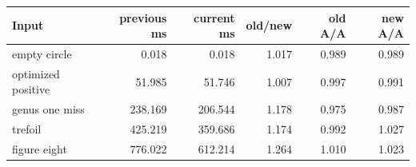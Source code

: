 \begin{center}
\small
\begin{tabular}{lrrrrr}
\toprule
Input & previous ms & current ms & old/new & old A/A & new A/A\\
\midrule
empty circle & 0.018 & 0.018 & 1.017 & 0.989 & 0.989\\
optimized positive & 51.985 & 51.746 & 1.007 & 0.997 & 0.991\\
genus one miss & 238.169 & 206.544 & 1.178 & 0.975 & 0.987\\
trefoil & 425.219 & 359.686 & 1.174 & 0.992 & 1.027\\
figure eight & 776.022 & 612.214 & 1.264 & 1.010 & 1.023\\
\bottomrule
\end{tabular}
\end{center}
